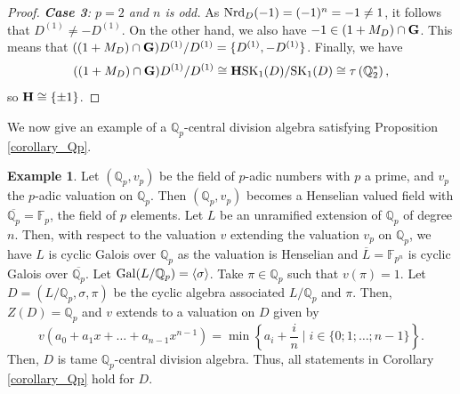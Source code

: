 \documentclass{amsart}
\theoremstyle{definition}
\newtheorem{example}{Example}
\numberwithin{equation}{section} %
\begin{document}
\begin{proof}
	\medskip 
	
	\textit{\textbf{Case 3}: $p=2$ and $n$ is odd.} As ${\rm Nrd}_D(-1) = (-1)^n = -1 \ne 1$, it follows that $D^{(1)} \ne -D^{(1)}$. On the other hand, we also have $-1 \in (1+M_D)\cap {\bf G}$. This means that $((1+M_D)\cap {\bf G})D^{(1)}/D^{(1)} = \{D^{(1)},-D^{(1)}\}$. Finally, we have 
	$$
	((1+M_D)\cap {\bf G})D^{(1)}/D^{(1)} \cong {\bf H}{\rm SK}_1(D)/{\rm SK}_1(D) \cong\tau\left(\mathbb{Q}_2^*\right),
	$$
	so ${\bf H} \cong \{\pm 1 \}$.
\end{proof}

We now give an example of a ${\mathbb{Q}_p}$-central division algebra satisfying Proposition \ref{corollary_Qp}. 

\begin{example}\label{example_1}
	Let $(\mathbb{Q}_p,v_p)$ be the field of $p$-adic numbers with $p$ a prime, and $v_p$ the $p$-adic valuation on $\mathbb{Q}_p$. Then $(\mathbb{Q}_p,v_p)$ becomes a Henselian valued field with $\overline{\mathbb{Q}_p}=\mathbb{F}_p$, the field of $p$ elements. Let $L$ be an unramified extension of $\mathbb{Q}_p$ of degree $n$. Then, with respect to the valuation $v$ extending the valuation $v_p$ on $\mathbb{Q}_p$, we have $L$ is cyclic Galois over $\mathbb{Q}_p$ as the valuation is Henselian and $\overline{L}=\mathbb{F}_{p^n}$ is cyclic Galois over $\overline{\mathbb{Q}_p}$. Let ${\rm Gal}(L/\mathbb{Q}_p)=\langle\sigma\rangle$. Take $\pi\in \mathbb{Q}_p$ such that $v(\pi)=1$. Let $D=(L/\mathbb{Q}_p, \sigma,\pi)$ be the cyclic algebra associated $L/\mathbb{Q}_p$ and $\pi$. Then, $Z(D) = \mathbb{Q}_p$ and $v$ extends to a valuation on $D$ given by 
	$$
	v\left(a_0+a_1x+\ldots+a_{n-1}x^{n-1}\right)=\min\left\{a_i+\dfrac{i}{n}\mid i \in 
	\{0;1;\ldots;n-1\}\right\}.
	$$
	Then, $D$ is tame $\mathbb{Q}_p$-central division algebra. Thus, all statements in Corollary \ref{corollary_Qp} hold for $D$.
\end{example}
\end{document}
